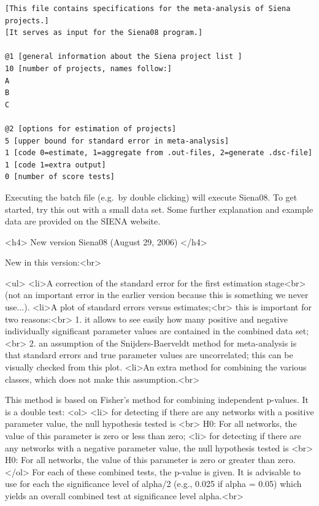 \documentclass[a4paper,fleqn]{article}
\newcommand{\+}{\, + \,}
\newcommand{\SI}{{\sf SIENA }}
\begin{document}
{\begin{verbatim}
[This file contains specifications for the meta-analysis of Siena projects.]
[It serves as input for the Siena08 program.]

@1 [general information about the Siena project list ]
10 [number of projects, names follow:]
A
B
C

@2 [options for estimation of projects]
5 [upper bound for standard error in meta-analysis]
1 [code 0=estimate, 1=aggregate from .out-files, 2=generate .dsc-file]
1 [code 1=extra output]
0 [number of score tests]
\end{verbatim}

   \noindent
   Executing the batch file (e.g.\ by double clicking) will execute \textsf{Siena08}.
   To get started, try this out with a small data set.
   Some further explanation and example data are provided on the \SI website.
\bigskip
\fi

\iffalse

<h4>
New version Siena08 (August 29, 2006)
</h4>

New in this version:<br>

<ul>
<li>A correction of the standard error for the first estimation stage<br>
    (not an important error in the earlier version because this is something we never use...).
<li>A plot of standard errors versus estimates;<br>
    this is important for two reasons:<br>
    1. it allows to see easily how many positive and negative individually significant
     parameter values are contained in the combined data set;<br>
    2. an assumption of the Snijders-Baerveldt \citeyearpar{SnijdersBaerveldt03}
    method for meta-analysis is that standard errors and true parameter values
    are uncorrelated; this can be visually checked from this plot.
<li>An extra method for combining the various classes, which does not make this assumption.<br>

    This method is based on Fisher's method for combining independent p-values.
    It is a double test:
    <ol>
    <li> for detecting if there are any networks with a positive parameter value, the null hypothesis
         tested is <br>
         H0: For all networks, the value of this parameter is zero or less than zero;
    <li> for detecting if there are any networks with a negative parameter value, the null hypothesis
         tested is <br>
         H0: For all networks, the value of this parameter is zero or greater than zero.
    </ol>
    For each of these combined tests, the p-value is given.
    It is advisable to use for each the significance level of alpha/2 (e.g., 0.025 if alpha = 0.05)
    which yields an overall combined test at significance level alpha.<br>

}
\end{document}
